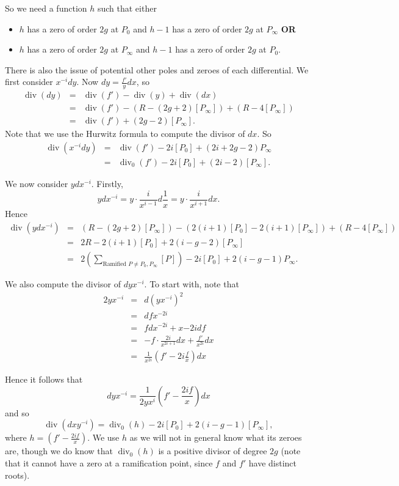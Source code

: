 \documentclass[draft, 11pt]{article} %
\theoremstyle{plain}
\theoremstyle{remark}
\DeclareMathOperator{\di}{div}
\begin{document}
So we need a function $h$ such that either 
\begin{itemize}
 	\item $h$ has a zero of order $2g$ at $P_0$ and $h-1$ has a zero of order $2g$ at $P_\infty$ {\bf OR}
	\item $h$ has a zero of order $2g$ at $P_\infty$ and $h-1$ has a zero of order $2g$ at $P_0$.
\end{itemize}

There is also the issue of potential other poles and zeroes of each differential.
We first consider $x^{-i}dy$.
Now $ dy = \frac{f'}{y}dx$, so \begin{eqnarray*} \di (dy) & = & \di(f') - \di (y) + \di (dx) \\ & = & \di(f') - (R - (2g+2)[P_\infty]) + (R - 4[P_\infty])\\  & = & \di(f') +(2g-2)[P_\infty].\end{eqnarray*}
Note that we use the Hurwitz formula to compute the divisor of $dx$.
So \begin{eqnarray} \di(x^{-i}dy) & = &  \di(f') -2i[P_0] + (2i +2g-2)P_{\infty} \\ & = & \di_0(f') - 2i[P_0] + (2i-2)[P_\infty]. \end{eqnarray}

We now consider $ydx^{-i}$.
Firstly, \[ y dx^{-i} = y\cdot \frac{i}{x^{i-1}}d\frac{1}{x} = y \cdot \frac{i}{x^{i+1}} dx.\]
Hence \begin{eqnarray*} \di (ydx^{-i}) & = & (R - (2g+2)[P_\infty]) -(2(i+1)[P_0] - 2(i+1)[P_\infty]) + (R - 4[P_\infty]) \\ & = &  2R - 2(i+1)[P_0] + 2(i-g-2)[P_\infty] \\ & = & 2\left ( \sum_{\text{Ramified } P\neq P_0, P_\infty}[P]\right) - 2i[P_0] +2(i-g-1)P_\infty .\end{eqnarray*}


We also compute the divisor of $dyx^{-i}$.
To start with, note that 
\begin{eqnarray}
2yx^{-i} & = & d(yx^{-i})^2 \\
& = & dfx^{-2i} \\
& = & fdx^{-2i} + x{-2i}df \\
& = & -f\cdot\frac{2i}{x^{2i+1}}dx + \frac{f'}{x^{2i}}dx \\
& = & \frac{1}{x^{2i}}\left( f' - 2i\frac{f}{x}\right) dx 
\end{eqnarray}

Hence it follows that 
\begin{equation*}
dyx^{-i} = \frac{1}{2yx^{i}}\left( f' - \frac{2if}{x} \right) dx
\end{equation*}
and so
\[
\di (dxy^{-i}) = \di_0(h) -2i[P_0] +2(i-g-1)[P_\infty],
\]
where $h = \left ( f'-\frac{2if}{x} \right )$.
We use $h$ as we will not in general know what its zeroes are, though we do know that $\di_0(h)$ is a positive divisor of degree $2g$ (note that it cannot have a zero at a ramification point, since $f$ and $f'$ have distinct roots).
\end{document}
